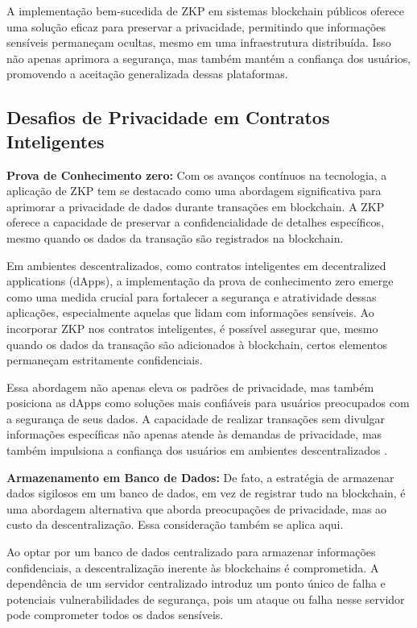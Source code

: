 A implementação bem-sucedida de ZKP em sistemas blockchain públicos oferece uma solução eficaz para preservar a privacidade, permitindo que informações sensíveis permaneçam ocultas, mesmo em uma infraestrutura distribuída. Isso não apenas aprimora a segurança, mas também mantém a confiança dos usuários, promovendo a aceitação generalizada dessas plataformas.

 



\subsection{Desafios de Privacidade em Contratos Inteligentes}

\textbf{Prova de Conhecimento zero: }Com os avanços contínuos na tecnologia, a aplicação de ZKP tem se destacado como uma abordagem significativa para aprimorar a privacidade de dados durante transações em blockchain. A ZKP oferece a capacidade de preservar a confidencialidade de detalhes específicos, mesmo quando os dados da transação são registrados na blockchain.

Em ambientes descentralizados, como contratos inteligentes em decentralized applications (dApps), a implementação da prova de conhecimento zero emerge como uma medida crucial para fortalecer a segurança e atratividade dessas aplicações, especialmente aquelas que lidam com informações sensíveis. Ao incorporar ZKP nos contratos inteligentes, é possível assegurar que, mesmo quando os dados da transação são adicionados à blockchain, certos elementos permaneçam estritamente confidenciais.

Essa abordagem não apenas eleva os padrões de privacidade, mas também posiciona as dApps como soluções mais confiáveis para usuários preocupados com a segurança de seus dados. A capacidade de realizar transações sem divulgar informações específicas não apenas atende às demandas de privacidade, mas também impulsiona a confiança dos usuários em ambientes descentralizados \cite{SMPP}.

\textbf{Armazenamento em Banco de Dados: }De fato, a estratégia de armazenar dados sigilosos em um banco de dados, em vez de registrar tudo na blockchain, é uma abordagem alternativa que aborda preocupações de privacidade, mas ao custo da descentralização. Essa consideração também se aplica aqui.

Ao optar por um banco de dados centralizado para armazenar informações confidenciais, a descentralização inerente às blockchains é comprometida. A dependência de um servidor centralizado introduz um ponto único de falha e potenciais vulnerabilidades de segurança, pois um ataque ou falha nesse servidor pode comprometer todos os dados sensíveis.

